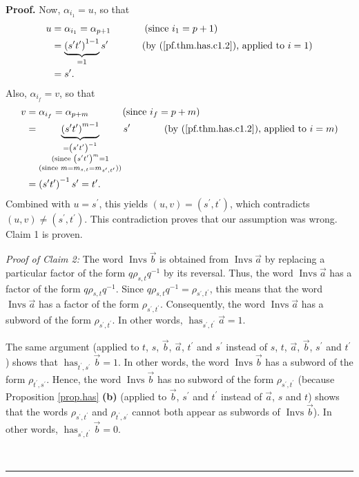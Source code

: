 \documentclass[numbers=enddot,12pt,final,onecolumn,notitlepage,abstracton]{scrartcl}%
\theoremstyle{definition}
\newenvironment{proof}[1][Proof]{\noindent\textbf{#1.} }{\ \rule{0.5em}{0.5em}}
\begin{document}
\begin{proof}
Now, $\alpha_{i_{1}}=u$, so that%
\begin{align*}
u  &  =\alpha_{i_{1}}=\alpha_{p+1}\ \ \ \ \ \ \ \ \ \ \left(  \text{since
}i_{1}=p+1\right) \\
&  =\underbrace{\left(  s^{\prime}t^{\prime}\right)  ^{1-1}}_{=1}s^{\prime
}\ \ \ \ \ \ \ \ \ \ \left(  \text{by (\ref{pf.thm.has.c1.2}), applied to
}i=1\right) \\
&  =s^{\prime}.
\end{align*}
Also, $\alpha_{i_{f}}=v$, so that%
\begin{align*}
v  &  =\alpha_{i_{f}}=\alpha_{p+m}\ \ \ \ \ \ \ \ \ \ \left(  \text{since
}i_{f}=p+m\right) \\
&  =\underbrace{\left(  s^{\prime}t^{\prime}\right)  ^{m-1}}%
_{\substack{=\left(  s^{\prime}t^{\prime}\right)  ^{-1}\\\text{(since }\left(
s^{\prime}t^{\prime}\right)  ^{m}=1\\\text{(since }m=m_{s,t}=m_{s^{\prime
},t^{\prime}}\text{))}}}s^{\prime}\ \ \ \ \ \ \ \ \ \ \left(  \text{by
(\ref{pf.thm.has.c1.2}), applied to }i=m\right) \\
&  =\left(  s^{\prime}t^{\prime}\right)  ^{-1}s^{\prime}=t^{\prime}.
\end{align*}
Combined with $u=s^{\prime}$, this yields $\left(  u,v\right)  =\left(
s^{\prime},t^{\prime}\right)  $, which contradicts $\left(  u,v\right)
\neq\left(  s^{\prime},t^{\prime}\right)  $. This contradiction proves that
our assumption was wrong. Claim 1 is proven.

\textit{Proof of Claim 2:} The word $\operatorname*{Invs}\overrightarrow{b}$
is obtained from $\operatorname*{Invs}\overrightarrow{a}$ by replacing a
particular factor of the form $q\rho_{s,t}q^{-1}$ by its reversal. Thus, the
word $\operatorname*{Invs}\overrightarrow{a}$ has a factor of the form
$q\rho_{s,t}q^{-1}$. Since $q\rho_{s,t}q^{-1}=\rho_{s^{\prime},t^{\prime}}$,
this means that the word $\operatorname*{Invs}\overrightarrow{a}$ has a factor
of the form $\rho_{s^{\prime},t^{\prime}}$. Consequently, the word
$\operatorname*{Invs}\overrightarrow{a}$ has a subword of the form
$\rho_{s^{\prime},t^{\prime}}$. In other words, $\operatorname*{has}%
\nolimits_{s^{\prime},t^{\prime}}\overrightarrow{a}=1$.

The same argument (applied to $t$, $s$, $\overrightarrow{b}$,
$\overrightarrow{a}$, $t^{\prime}$ and $s^{\prime}$ instead of $s$, $t$,
$\overrightarrow{a}$, $\overrightarrow{b}$, $s^{\prime}$ and $t^{\prime}$)
shows that $\operatorname*{has}\nolimits_{t^{\prime},s^{\prime}}%
\overrightarrow{b}=1$. In other words, the word $\operatorname*{Invs}%
\overrightarrow{b}$ has a subword of the form $\rho_{t^{\prime},s^{\prime}}$.
Hence, the word $\operatorname*{Invs}\overrightarrow{b}$ has no subword of the
form $\rho_{s^{\prime},t^{\prime}}$ (because Proposition \ref{prop.has}
\textbf{(b)} (applied to $\overrightarrow{b}$, $s^{\prime}$ and $t^{\prime}$
instead of $\overrightarrow{a}$, $s$ and $t$) shows that the words
$\rho_{s^{\prime},t^{\prime}}$ and $\rho_{t^{\prime},s^{\prime}}$ cannot both
appear as subwords of $\operatorname*{Invs}\overrightarrow{b}$). In other
words, $\operatorname*{has}\nolimits_{s^{\prime},t^{\prime}}\overrightarrow{b}%
=0$.


\end{proof}
\end{document}
